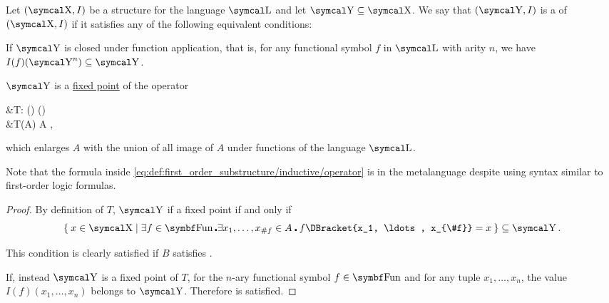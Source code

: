 \begin{definition}\label{def:first_order_substructure}
  Let \( (\CX, I) \) be a structure for the language \( \CL \) and let \( \CY \subseteq \CX \). We say that \( (\CY, I) \) is a  of \( (\CX, I) \) if it satisfies any of the following equivalent conditions:

  \begin{DefEnum}
     If \( \CY \) is closed under function application, that is, for any functional symbol \( f \) in \( \CL \) with arity \( n \), we have \( I(f)(\CY^n) \subseteq \CY \).

     \( \CY \) is a \hyperref[def:fixed_point]{fixed point} of the operator
    \begin{AlignedEquation}\label{eq:def:first_order_substructure/inductive/operator}
      &T: \Pow(\CX) \to \Pow(\CX) \\
      &T(A) \coloneqq A \cup {},
    \end{AlignedEquation}
    which enlarges \( A \) with the union of all image of \( A \) under functions of the language \( \CL \).

    Note that the formula inside \eqref{eq:def:first_order_substructure/inductive/operator} is in the metalanguage despite using syntax similar to first-order logic formulas.
  \end{DefEnum}
\end{definition}
\begin{proof}
  By definition of \( T \), \( \CY \) if a fixed point if and only if
  \begin{equation*}
    \Set{ x \in \CX \mid \exists f \in \Bold{Fun} \centerdot \exists x_1, \ldots, x_{\#f} \in A \centerdot f\DBracket{x_1, \ldots, x_{\#f}} = x } \subseteq \CY.
  \end{equation*}

  This condition is clearly satisfied if \( B \) satisfies .

  If, instead \( \CY \) is a fixed point of \( T \), for the \( n \)-ary functional symbol \( f \in \Bold{Fun} \) and for any tuple \( x_1, \ldots, x_n \), the value \( I(f)(x_1, \ldots, x_n) \) belongs to \( \CY \). Therefore  is satisfied.
\end{proof}

